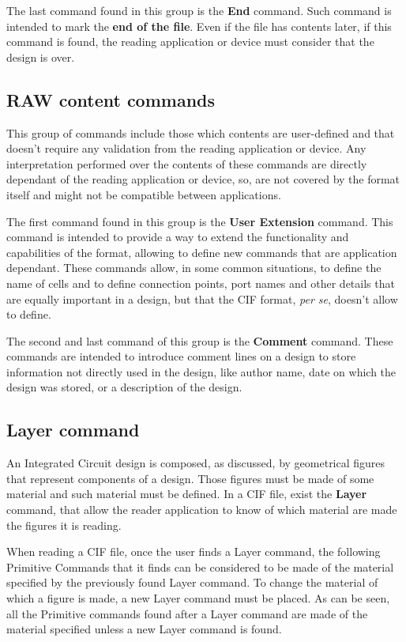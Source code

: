\documentclass[11pt,twoside,openany,x11names,svgnames]{memoir}
\begin{document}
The last command found in this group is the \textbf{End} command. Such command is intended to mark the \textbf{end of the file}. Even if the file has contents later, if this command is found, the reading application or device must consider that the design is over.

\subsection{RAW content commands}\label{RAW-content-commands}

This group of commands include those which contents are user-defined and that doesn't require any validation from the reading application or device. Any interpretation performed over the contents of these commands are directly dependant of the reading application or device, so, are not covered by the format itself and might not be compatible between applications.

The first command found in this group is the \textbf{User Extension} command. This command is intended to provide a way to extend the functionality and capabilities of the format, allowing to define new commands that are application dependant. These commands allow, in some common situations, to define the name of cells and to define connection points, port names and other details that are equally important in a design, but that the CIF format, \textit{per se}, doesn't allow to define.

The second and last command of this group is the \textbf{Comment} command. These commands are intended to introduce comment lines on a design to store information not directly used in the design, like author name, date on which the design was stored, or a description of the design.

\subsection{Layer command}\label{Layer-command}

An Integrated Circuit design is composed, as discussed, by geometrical figures that represent components of a design. Those figures must be made of some material and such material must be defined. In a CIF file, exist the \textbf{Layer} command, that allow the reader application to know of which material are made the figures it is reading.

When reading a CIF file, once the user finds a Layer command, the following Primitive Commands that it finds can be considered to be made of the material specified by the previously found Layer command. To change the material of which a figure is made, a new Layer command must be placed. As can be seen, all the Primitive commands found after a Layer command are made of the material specified unless a new Layer command is found.
\end{document}
